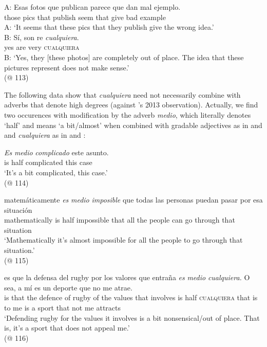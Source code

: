 \ea 
\label{bkm:Ref150786385} %
\ea \gll A: Esas fotos que publican parece que dan mal ejemplo.\\
    { } those pics that publish seem that give bad example\\
\glt A: ‘It seems that these pics that they publish give the wrong idea.’\\
\ex \gll B: Sí, son re \textit{cualquiera}.\\
    {  } yes are very \textsc{cualquiera}\\
\glt B: ‘Yes, they [these photos] are completely out of place. The idea that these pictures represent does not make sense.’\\
  (@ 113)
\z
\z 

The following data show that \textit{cualquiera} need not necessarily combine with adverbs that denote high degrees (against \citeauthor{Salierno2013}’s 2013 observation). Actually, we find two occurences with modification by the adverb \textit{medio}, which literally denotes ‘half’ and means ‘a bit/almost’ when combined with gradable adjectives as in  and  and \textit{cualquiera} as in  and :

\ea \label{bkm:Ref150786427}  %
\gll \textit{Es} \textit{medio} \textit{complicado} este asunto.\\
    is half complicated this case\\
\glt ‘It’s a bit complicated, this case.’\\
    (@ 114)
\z


\ea \label{bkm:Ref150786436}  %
    \gll matemáticamente \textit{es} \textit{medio} \textit{imposible} que todas las personas puedan pasar por esa situación\\
    mathematically is half impossible that all the people can go through that situation\\
    \glt ‘Mathematically it’s almost impossible for all the people to go through that situation.’\\
    (@ 115)
\z


\ea \label{bkm:Ref150786444} %
\gll es que la defensa del rugby por los valores que entraña \textit{es} \textit{medio} \textit{cualquiera.} O sea, a mí es un deporte que no me atrae.\\
    is that the defence of rugby of the values that involves is half \textsc{cualquiera} that is to me is a sport that not me attracts\\
    \glt ‘Defending rugby for the values it involves is a bit nonsensical/out of place. That is, it’s a sport that does not appeal me.’\\
    (@ 116)
\z


